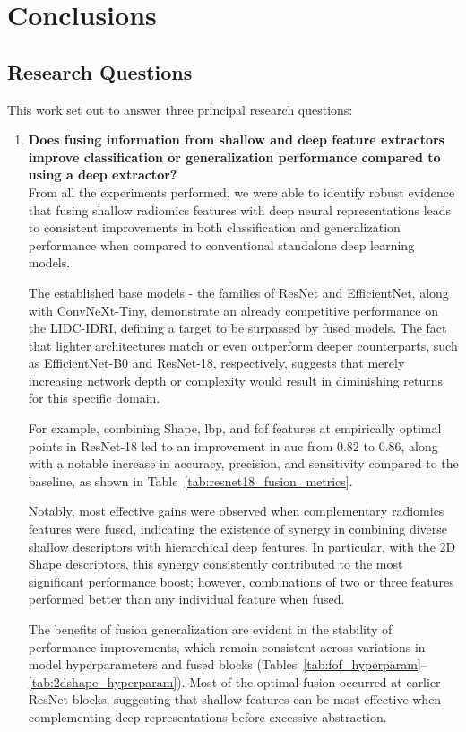 \chapter{Conclusions}\label{chap:conclusions}

\section{Research Questions}


This work set out to answer three principal research questions:

\begin{enumerate}
  \item \textbf{Does fusing information from shallow and deep feature extractors improve classification or generalization performance compared to using a deep extractor?}\\
From all the experiments performed, we were able to identify robust evidence that fusing shallow radiomics features with deep neural representations leads to consistent improvements in both classification and generalization performance when compared to conventional standalone deep learning models.

The established base models - the families of ResNet and EfficientNet, along with ConvNeXt-Tiny, demonstrate an already competitive performance on the LIDC-IDRI, defining a target to be surpassed by fused models. The fact that lighter architectures match or even outperform deeper counterparts, such as EfficientNet-B0 and ResNet-18, respectively, suggests that merely increasing network depth or complexity would result in diminishing returns for this specific domain.

For example, combining Shape, \ac{lbp}, and \ac{fof} features at empirically optimal points in ResNet-18 led to an improvement in \ac{auc} from 0.82 to 0.86, along with a notable increase in accuracy, precision, and sensitivity compared to the baseline, as shown in Table~\ref{tab:resnet18_fusion_metrics}.

Notably, most effective gains were observed when complementary radiomics features were fused, indicating the existence of synergy in combining diverse shallow descriptors with hierarchical deep features. In particular, with the 2D Shape descriptors, this synergy consistently contributed to the most significant performance boost; however, combinations of two or three features performed better than any individual feature when fused.

The benefits of fusion generalization are evident in the stability of performance improvements, which remain consistent across variations in model hyperparameters and fused blocks (Tables~\ref{tab:fof_hyperparam}--\ref{tab:2dshape_hyperparam}).
Most of the optimal fusion occurred at earlier ResNet blocks, suggesting that shallow features can be most effective when complementing deep representations before excessive abstraction. 


\end{enumerate}
